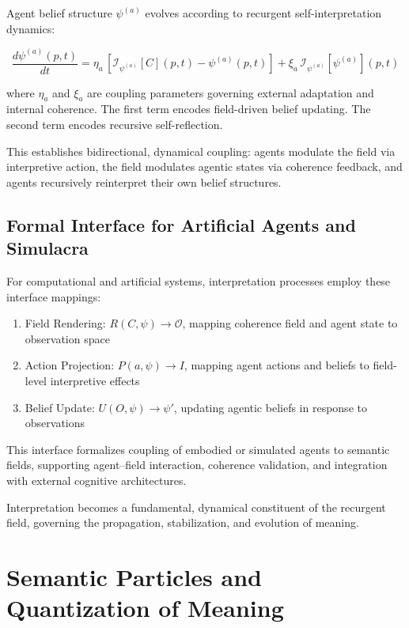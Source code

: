 Agent belief structure \(\psi^{(a)}\) evolves according to recurgent self-interpretation dynamics:

\begin{equation}
\frac{d\psi^{(a)}(p, t)}{dt} = \eta_a\, [\mathcal{I}_{\psi^{(a)}}[C](p, t) - \psi^{(a)}(p, t)] + \xi_a\, \mathcal{I}_{\psi^{(a)}}[\psi^{(a)}](p, t)
\end{equation}

where \(\eta_a\) and \(\xi_a\) are coupling parameters governing external adaptation and internal coherence. The first term encodes field-driven belief updating. The second term encodes recursive self-reflection.

This establishes bidirectional, dynamical coupling: agents modulate the field via interpretive action, the field modulates agentic states via coherence feedback, and agents recursively reinterpret their own belief structures.

\subsection{Formal Interface for Artificial Agents and Simulacra}

For computational and artificial systems, interpretation processes employ these interface mappings:
\begin{enumerate}
    \item Field Rendering: \(R(C, \psi) \to \mathcal{O}\), mapping coherence field and agent state to observation space
    \item Action Projection: \(P(a, \psi) \to I\), mapping agent actions and beliefs to field-level interpretive effects
    \item Belief Update: \(U(O, \psi) \to \psi'\), updating agentic beliefs in response to observations
\end{enumerate}

This interface formalizes coupling of embodied or simulated agents to semantic fields, supporting agent–field interaction, coherence validation, and integration with external cognitive architectures.

Interpretation becomes a fundamental, dynamical constituent of the recurgent field, governing the propagation, stabilization, and evolution of meaning.

\section{Semantic Particles and Quantization of Meaning}

